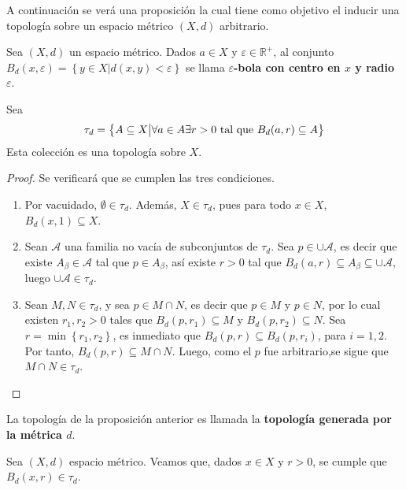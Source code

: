 \documentclass[12pt]{report}
\theoremstyle{largebreak}
\begin{document}
    A continuación se verá una proposición la cual tiene como objetivo el inducir una topología sobre un espacio métrico $(X,d)$ arbitrario.

    \begin{propo}
        Sea $(X,d)$ un espacio métrico. Dados $a\in X$ y $\varepsilon\in\mathbb{R}^+$, al conjunto $B_d(x,\varepsilon)=\left\{y\in X\big|d(x,y)<\varepsilon \right\}$ se llama \textbf{$\varepsilon$-bola con centro en $x$ y radio $\varepsilon$}. 
        
        Sea
        \begin{equation*}
            \tau_d=\left\{A\subseteq X\big| \forall a\in A \exists r>0\textup{ tal que }B_d(a,r)\subseteq A \right\}
        \end{equation*}
        Esta colección es una topología sobre $X$.
    \end{propo}

    \begin{proof}
        Se verificará que se cumplen las tres condiciones.
        \begin{enumerate}
            \item Por vacuidado, $\emptyset\in\tau_d$. Además, $X\in\tau_d$, pues para todo $x\in X$, $B_d(x,1)\subseteq X$.
            \item Sean $\mathcal{A}$ una familia no vacía de subconjuntos de $\tau_d$. Sea $p\in\cup\mathcal{A}$, es decir que existe $A_\beta\in\mathcal{A}$ tal que $p\in A_\beta$, así existe $r>0$ tal que $B_d(a,r)\subseteq A_\beta\subseteq\cup\mathcal{A}$, luego $\cup\mathcal{A}\in\tau_d$.
            \item Sean $M,N\in\tau_d$, y sea $p\in M\cap N$, es decir que $p\in M$ y $p\in N$, por lo cual existen $r_1,r_2>0$ tales que $B_d(p,r_1)\subseteq M$ y $B_d(p,r_2)\subseteq N$. Sea $r=\min\left\{r_1,r_2\right\}$, es inmediato que $B_d(p,r)\subseteq B_d(p,r_i)$, para $i=1,2$. Por tanto, $B_d(p,r)\subseteq M\cap N$. Luego, como el $p$ fue arbitrario,se sigue que $M\cap N\in \tau_d$.
        \end{enumerate}
    \end{proof}

    \begin{mydef}
        La topología de la proposición anterior es llamada la \textbf{topología generada por la métrica $d$}.
    \end{mydef}

    Sea $(X,d)$ espacio métrico. Veamos que, dados $x\in X$ y $r>0$, se cumple que $B_d(x,r)\in\tau_d$.
\end{document}
